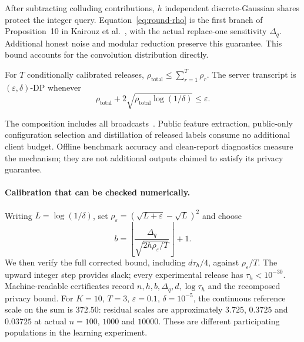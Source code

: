 After subtracting colluding contributions, $h$ independent discrete-Gaussian
shares protect the integer query. Equation~\eqref{eq:round-rho} is the first
branch of Proposition~10 in Kairouz et al.~\cite{kairouz2021distributed},
with the actual replace-one sensitivity $\Delta_q$. Additional honest noise
and modular reduction preserve this guarantee. This bound accounts for the
convolution distribution directly.

\begin{theorem}
\label{thm:run}
For $T$ conditionally calibrated releases,
$\rho_{\mathrm{total}}\le\sum_{r=1}^T\rho_r$. The server transcript is
$(\varepsilon,\delta)$-DP whenever
\begin{equation}
\rho_{\mathrm{total}}+2\sqrt{\rho_{\mathrm{total}}\log(1/\delta)}
\le\varepsilon.\label{eq:accounting}
\end{equation}
\end{theorem}

The composition includes all broadcasts~\cite{bun2016concentrated}.
Public feature extraction, public-only configuration selection and
distillation of released labels consume no additional client budget.
Offline benchmark accuracy and clean-report diagnostics measure the mechanism;
they are not additional outputs claimed to satisfy its privacy guarantee.

\paragraph{Calibration that can be checked numerically.}
Writing $L=\log(1/\delta)$, set
$\rho_\varepsilon=(\sqrt{L+\varepsilon}-\sqrt L)^2$ and choose
\begin{equation}
b=\left\lfloor\frac{\Delta_q}{\sqrt{2h\rho_\varepsilon/T}}\right\rfloor+1.
\label{eq:integer-scale}
\end{equation}
We then verify the full corrected bound, including $d\tau_h/4$, against
$\rho_\varepsilon/T$. The upward integer step provides slack; every
experimental release has $\tau_h<10^{-30}$. Machine-readable certificates
record $n,h,b,\Delta_q,d,\log\tau_h$ and the recomposed privacy bound.
For $K=10$, $T=3$, $\varepsilon=0.1$, $\delta=10^{-5}$, the continuous
reference scale on the sum is $372.50$: residual scales are approximately
$3.725$, $0.3725$ and $0.03725$ at actual $n=100$, $1000$ and $10000$.
These are different participating populations in the learning experiment.

